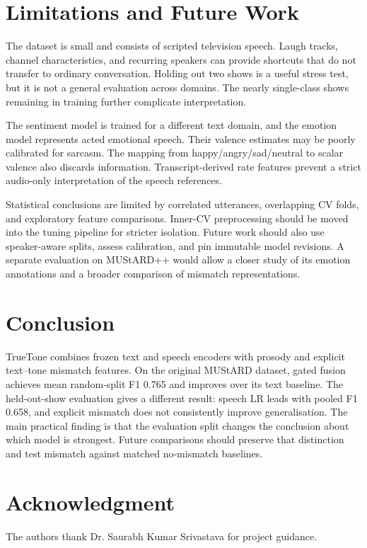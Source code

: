 \documentclass[conference]{IEEEtran}
\begin{document}
\section{Limitations and Future Work}
The dataset is small and consists of scripted television speech. Laugh tracks, channel characteristics, and recurring speakers can provide shortcuts that do not transfer to ordinary conversation. Holding out two shows is a useful stress test, but it is not a general evaluation across domains. The nearly single-class shows remaining in training further complicate interpretation.

The sentiment model is trained for a different text domain, and the emotion model represents acted emotional speech. Their valence estimates may be poorly calibrated for sarcasm. The mapping from happy/angry/sad/neutral to scalar valence also discards information. Transcript-derived rate features prevent a strict audio-only interpretation of the speech references.

Statistical conclusions are limited by correlated utterances, overlapping CV folds, and exploratory feature comparisons. Inner-CV preprocessing should be moved into the tuning pipeline for stricter isolation. Future work should also use speaker-aware splits, assess calibration, and pin immutable model revisions. A separate evaluation on MUStARD++ would allow a closer study of its emotion annotations and a broader comparison of mismatch representations.

\section{Conclusion}
TrueTone combines frozen text and speech encoders with prosody and explicit text--tone mismatch features. On the original MUStARD dataset, gated fusion achieves mean random-split F1 0.765 and improves over its text baseline. The held-out-show evaluation gives a different result: speech LR leads with pooled F1 0.658, and explicit mismatch does not consistently improve generalisation. The main practical finding is that the evaluation split changes the conclusion about which model is strongest. Future comparisons should preserve that distinction and test mismatch against matched no-mismatch baselines.

\section*{Acknowledgment}
The authors thank Dr. Saurabh Kumar Srivastava for project guidance.



\end{document}
